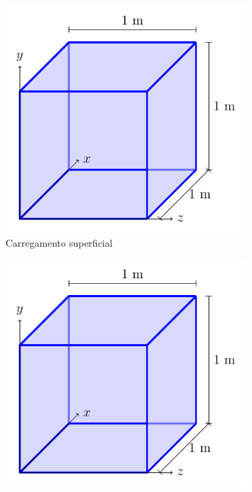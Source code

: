 \begin{figure}
    \centering
    \caption{Condições de contorno para os casos tridimensionais.}
    \begin{subfigure}[b]{0.45\textwidth}
        \centering
        \includegraphics[page=3]{Figuras/verificacao_cubo.pdf}
        \caption{Carregamento superficial}
        \label{fig:verificacao_cubo_3}
    \end{subfigure}
    \begin{subfigure}[b]{0.45\textwidth}
        \centering
        \includegraphics[page=4]{Figuras/verificacao_cubo.pdf}

\end{subfigure}
\end{figure}
